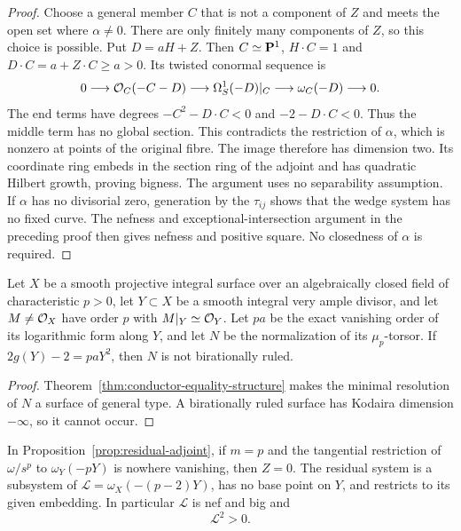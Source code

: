 \begin{proof}
Choose a general member $C$ that is not a component of $Z$ and meets
the open set where $\alpha\ne0$. There are only finitely many
components of $Z$, so this choice is possible.
Put $D=aH+Z$. Then $C\simeq\mathbf P^1$, $H\cdot C=1$ and
$D\cdot C=a+Z\cdot C\geq a>0$. Its twisted conormal sequence is
\[
 0\longrightarrow\mathcal O_C(-C-D)\longrightarrow
 \Omega^1_S(-D)|_C\longrightarrow\omega_C(-D)
 \longrightarrow0.
\]
The end terms have degrees $-C^2-D\cdot C<0$ and $-2-D\cdot C<0$.
Thus the middle term has no global section. This contradicts the
restriction of $\alpha$, which is nonzero at points of the original
fibre. The image therefore has dimension two. Its coordinate ring
embeds in the section ring of the adjoint and has quadratic Hilbert
growth, proving bigness. The argument uses no separability assumption.
If $\alpha$ has no divisorial zero, generation by the $\tau_{ij}$
shows that the wedge system has no fixed curve. The nefness and
exceptional-intersection argument in the preceding proof then gives
nefness and positive square. No closedness of $\alpha$ is required.
\end{proof}



\begin{corollary}\label{prop:higher-conductor-positive-genus-exclusion}
Let $X$ be a smooth projective integral surface over an algebraically
closed field of characteristic $p>0$, let $Y\subset X$ be a smooth
integral very ample divisor, and let $M\ne\mathcal O_X$ have order $p$ with
$M|_Y\simeq\mathcal O_Y$. Let $pa$ be the exact vanishing order of its
logarithmic form along $Y$, and let $N$ be the normalization of its
$\mu_p$-torsor. If $2g(Y)-2=paY^2$, then $N$ is not birationally ruled.
\end{corollary}

\begin{proof}
Theorem~\ref{thm:conductor-equality-structure} makes the minimal
resolution of $N$ a surface of general type. A birationally ruled
surface has Kodaira dimension $-\infty$, so it cannot occur.
\end{proof}

\begin{corollary}\label{lem:divided-differential-subsystem}
In Proposition~\ref{prop:residual-adjoint}, if $m=p$ and the tangential
restriction of $\omega/s^p$ to $\omega_Y(-pY)$ is nowhere vanishing,
then $Z=0$. The residual system is a subsystem of
$\mathcal L=\omega_X(-(p-2)Y)$, has no base point on $Y$, and restricts
to its given embedding. In particular $\mathcal L$ is nef and big and
\begin{equation}\label{eq:divided-subsystem-positive-square}
 \mathcal L^2>0.
\end{equation}
\end{corollary}

